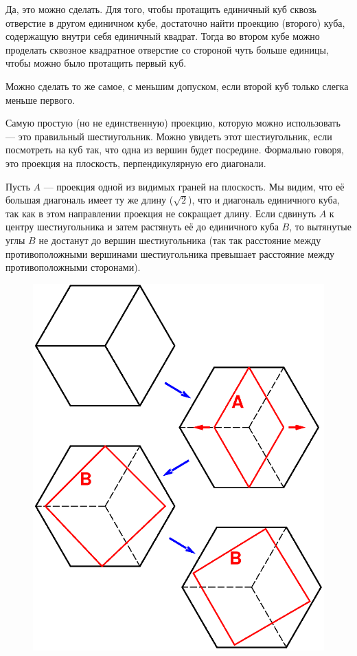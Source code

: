 
Да, это можно сделать.
Для того, чтобы протащить единичный куб сквозь отверстие в другом единичном кубе, достаточно найти проекцию (второго) куба, содержащую внутри себя единичный квадрат.
Тогда во втором кубе можно проделать сквозное квадратное отверстие %
со стороной чуть больше единицы, чтобы можно было протащить первый куб.

Можно сделать то же самое, с меньшим допуском, если второй куб только слегка меньше первого.

Самую простую (но не единственную) проекцию, которую можно использовать --- это правильный шестиугольник.
Можно увидеть этот шестиугольник, если посмотреть на куб так, что одна из вершин будет посредине.
Формально говоря, это проекция на плоскость, перпендикулярную его диагонали.

Пусть $A$ --- проекция одной из видимых граней на плоскость.
Мы видим, что её большая диагональ имеет ту же длину ($\sqrt{2}$), что и диагональ единичного куба, так как в этом направлении проекция не сокращает длину.
Если сдвинуть $A$ к центру шестиугольника и затем растянуть её до единичного куба $B$, то вытянутые углы $B$ не достанут до вершин шестиугольника (так так расстояние между противоположными вершинами шестиугольника превышает расстояние между противоположными сторонами).

\begin{figure}[h!]
\centering
\includegraphics[scale=0.7]{Figs/Geometry/pass}
\end{figure}

